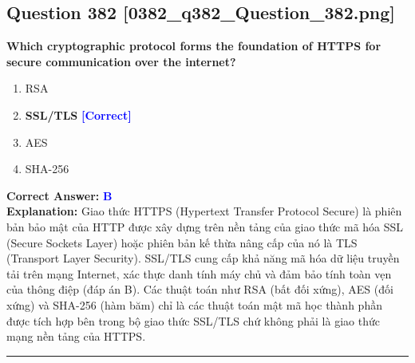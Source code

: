 \documentclass[11pt,a4paper]{article}
\begin{document}
\begin{minipage}{\textwidth}
\subsection*{Question 382 \quad \footnotesize{[0382\_q382\_Question\_382.png]}}
\noindent \textbf{Which cryptographic protocol forms the foundation of HTTPS for secure communication over the internet?}

\begin{enumerate}[label=\Alph*.]
    \item RSA
    \item \textbf{SSL/TLS} \hfill \textcolor{blue}{\textbf{[Correct]}}
    \item AES
    \item SHA-256
\end{enumerate}

\noindent \textbf{Correct Answer:} \textcolor{blue}{\textbf{B}} \\[2pt]
\noindent \textbf{Explanation:} Giao thức HTTPS (Hypertext Transfer Protocol Secure) là phiên bản bảo mật của HTTP được xây dựng trên nền tảng của giao thức mã hóa SSL (Secure Sockets Layer) hoặc phiên bản kế thừa nâng cấp của nó là TLS (Transport Layer Security). SSL/TLS cung cấp khả năng mã hóa dữ liệu truyền tải trên mạng Internet, xác thực danh tính máy chủ và đảm bảo tính toàn vẹn của thông điệp (đáp án B). Các thuật toán như RSA (bất đối xứng), AES (đối xứng) và SHA-256 (hàm băm) chỉ là các thuật toán mật mã học thành phần được tích hợp bên trong bộ giao thức SSL/TLS chứ không phải là giao thức mạng nền tảng của HTTPS.

\par\vspace{0.3cm}
\hrule
\vspace{0.3cm}
\end{minipage}
\end{document}
